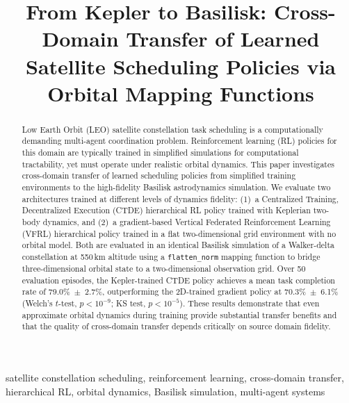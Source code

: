 \documentclass[conference]{IEEEtran}
\begin{document}
\title{From Kepler to Basilisk: Cross-Domain Transfer of Learned Satellite Scheduling Policies via Orbital Mapping Functions}

\author{
}

\maketitle

\begin{abstract}
Low Earth Orbit (LEO) satellite constellation task scheduling is a computationally demanding multi-agent coordination problem. Reinforcement learning (RL) policies for this domain are typically trained in simplified simulations for computational tractability, yet must operate under realistic orbital dynamics. This paper investigates cross-domain transfer of learned scheduling policies from simplified training environments to the high-fidelity Basilisk astrodynamics simulation. We evaluate two architectures trained at different levels of dynamics fidelity: (1)~a Centralized Training, Decentralized Execution (CTDE) hierarchical RL policy trained with Keplerian two-body dynamics, and (2)~a gradient-based Vertical Federated Reinforcement Learning (VFRL) hierarchical policy trained in a flat two-dimensional grid environment with no orbital model. Both are evaluated in an identical Basilisk simulation of a Walker-delta constellation at 550\,km altitude using a \texttt{flatten\_norm} mapping function to bridge three-dimensional orbital state to a two-dimensional observation grid. Over 50 evaluation episodes, the Kepler-trained CTDE policy achieves a mean task completion rate of 79.0\%~$\pm$~2.7\%, outperforming the 2D-trained gradient policy at 70.3\%~$\pm$~6.1\% (Welch's $t$-test, $p < 10^{-9}$; KS test, $p < 10^{-5}$). These results demonstrate that even approximate orbital dynamics during training provide substantial transfer benefits and that the quality of cross-domain transfer depends critically on source domain fidelity.
\end{abstract}

\begin{IEEEkeywords}
satellite constellation scheduling, reinforcement learning, cross-domain transfer, hierarchical RL, orbital dynamics, Basilisk simulation, multi-agent systems
\end{IEEEkeywords}
\end{document}
